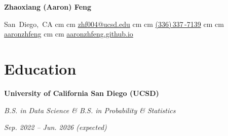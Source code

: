 \documentclass[10pt, letterpaper]{article}
\newenvironment{twocolentry}[2][]{
    \onecolentry
    \def\secondColumn{#2}
    \setcolumnwidth{\fill, 4.5 cm}
    \begin{paracol}{2}
}{
    \switchcolumn \raggedleft \secondColumn
    \end{paracol}
    \endonecolentry
}
\newenvironment{header}{
    \setlength{\topsep}{0pt}\par\kern\topsep\centering\linespread{1.5}
}{
    \par\kern\topsep
}
\newcommand{\AND}{\unskip\enspace\textbar\enspace}
\let\hrefWithoutArrow\href
\renewcommand{\href}[2]{\hrefWithoutArrow{#1}{\ifthenelse{\equal{#2}{}}{ }{#2}}}
\begin{document}
    \begin{header}
        \textbf{\fontsize{24 pt}{24 pt}\selectfont Zhaoxiang (Aaron) Feng}

        \vspace{0.3 cm}

        \normalsize
        \mbox{{\color{black}\footnotesize\faMapMarker*}\hspace*{0.13cm}San Diego, CA}%
         cm%
        \AND%
         cm%
        \mbox{\hrefWithoutArrow{mailto:zhf004@ucsd.edu}{\color{black}{\footnotesize\faEnvelope[regular]}\hspace*{0.13cm}zhf004@ucsd.edu}}%
         cm%
        \AND%
         cm%
        \mbox{\hrefWithoutArrow{tel:+13363377139}{\color{black}{\footnotesize\faPhone*}\hspace*{0.13cm}(336)\,337\,-7139}}%
         cm%
        \AND%
         cm%
        \mbox{\hrefWithoutArrow{https://github.com/aaronzhfeng}{\color{black}{\footnotesize\faGithub}\hspace*{0.13cm}aaronzhfeng}}%
         cm%
        \AND%
         cm%
        \mbox{\hrefWithoutArrow{https://aaronzhfeng.github.io/}{\color{black}{\footnotesize\faGlobe}\hspace*{0.13cm}aaronzhfeng.github.io}}%

    \end{header}

    \vspace{0.3 cm - 0.3 cm}

    \section{Education}

    \begin{twocolentry}{\textit{Sep. 2022 -- Jun. 2026 (expected)}}
        \textbf{University of California San Diego (UCSD)}

        \textit{B.S. in Data Science \& B.S. in Probability \& Statistics}
    \end{twocolentry}
\end{document}

